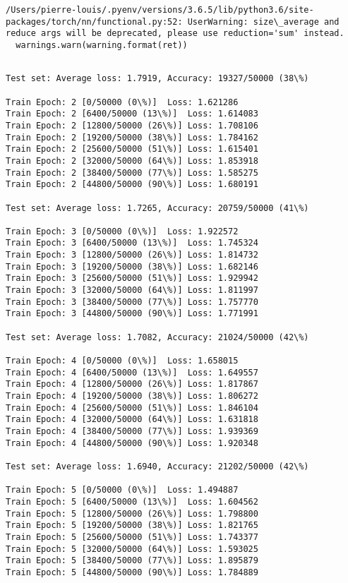 \documentclass[11pt]{article}
\begin{document}
    \begin{Verbatim}[commandchars=\\\{\}]
/Users/pierre-louis/.pyenv/versions/3.6.5/lib/python3.6/site-packages/torch/nn/functional.py:52: UserWarning: size\_average and reduce args will be deprecated, please use reduction='sum' instead.
  warnings.warn(warning.format(ret))

    \end{Verbatim}

    \begin{Verbatim}[commandchars=\\\{\}]

Test set: Average loss: 1.7919, Accuracy: 19327/50000 (38\%)

Train Epoch: 2 [0/50000 (0\%)]	Loss: 1.621286
Train Epoch: 2 [6400/50000 (13\%)]	Loss: 1.614083
Train Epoch: 2 [12800/50000 (26\%)]	Loss: 1.708106
Train Epoch: 2 [19200/50000 (38\%)]	Loss: 1.784162
Train Epoch: 2 [25600/50000 (51\%)]	Loss: 1.615401
Train Epoch: 2 [32000/50000 (64\%)]	Loss: 1.853918
Train Epoch: 2 [38400/50000 (77\%)]	Loss: 1.585275
Train Epoch: 2 [44800/50000 (90\%)]	Loss: 1.680191

Test set: Average loss: 1.7265, Accuracy: 20759/50000 (41\%)

Train Epoch: 3 [0/50000 (0\%)]	Loss: 1.922572
Train Epoch: 3 [6400/50000 (13\%)]	Loss: 1.745324
Train Epoch: 3 [12800/50000 (26\%)]	Loss: 1.814732
Train Epoch: 3 [19200/50000 (38\%)]	Loss: 1.682146
Train Epoch: 3 [25600/50000 (51\%)]	Loss: 1.929942
Train Epoch: 3 [32000/50000 (64\%)]	Loss: 1.811997
Train Epoch: 3 [38400/50000 (77\%)]	Loss: 1.757770
Train Epoch: 3 [44800/50000 (90\%)]	Loss: 1.771991

Test set: Average loss: 1.7082, Accuracy: 21024/50000 (42\%)

Train Epoch: 4 [0/50000 (0\%)]	Loss: 1.658015
Train Epoch: 4 [6400/50000 (13\%)]	Loss: 1.649557
Train Epoch: 4 [12800/50000 (26\%)]	Loss: 1.817867
Train Epoch: 4 [19200/50000 (38\%)]	Loss: 1.806272
Train Epoch: 4 [25600/50000 (51\%)]	Loss: 1.846104
Train Epoch: 4 [32000/50000 (64\%)]	Loss: 1.631818
Train Epoch: 4 [38400/50000 (77\%)]	Loss: 1.939369
Train Epoch: 4 [44800/50000 (90\%)]	Loss: 1.920348

Test set: Average loss: 1.6940, Accuracy: 21202/50000 (42\%)

Train Epoch: 5 [0/50000 (0\%)]	Loss: 1.494887
Train Epoch: 5 [6400/50000 (13\%)]	Loss: 1.604562
Train Epoch: 5 [12800/50000 (26\%)]	Loss: 1.798800
Train Epoch: 5 [19200/50000 (38\%)]	Loss: 1.821765
Train Epoch: 5 [25600/50000 (51\%)]	Loss: 1.743377
Train Epoch: 5 [32000/50000 (64\%)]	Loss: 1.593025
Train Epoch: 5 [38400/50000 (77\%)]	Loss: 1.895879
Train Epoch: 5 [44800/50000 (90\%)]	Loss: 1.784889


\end{Verbatim}
\end{document}
